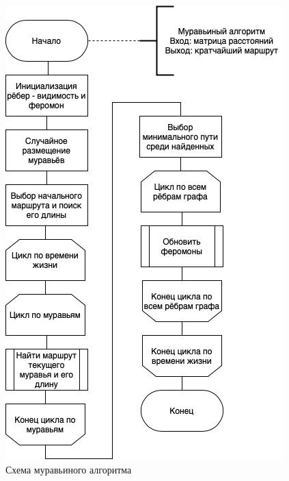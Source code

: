 \documentclass[12pt]{report}
\begin{document}
\begin{figure}[H]
		\centering
		\includegraphics[scale=0.8]{dg-ant.jpg}
		\caption{Схема муравьиного алгоритма}
		\label{fig:ant}
\end{figure}
\end{document}
